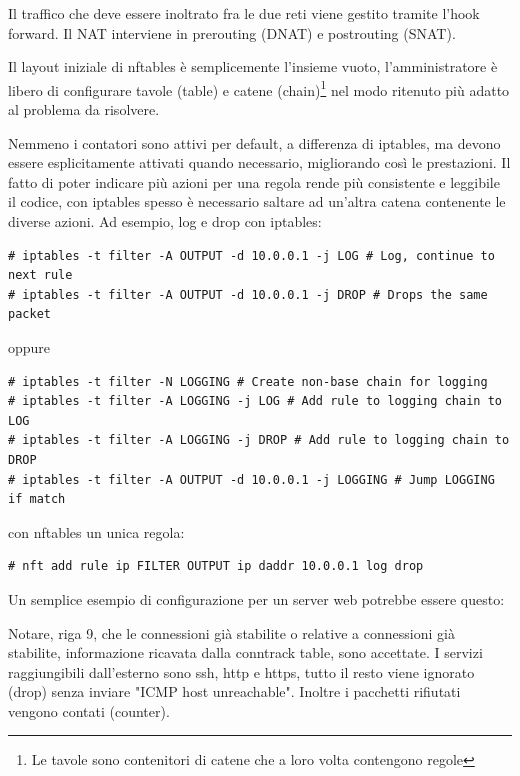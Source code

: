 Il traffico che deve essere inoltrato fra le due reti viene gestito tramite
l'hook forward. Il NAT interviene in prerouting (DNAT) e postrouting (SNAT).

Il layout iniziale di nftables \`e semplicemente l'insieme vuoto,
l'amministratore \`e libero di configurare tavole (table) e catene
(chain)\footnote{Le tavole sono contenitori di catene che a loro volta
contengono regole} nel modo ritenuto pi\`u adatto al problema da risolvere.

Nemmeno i contatori sono attivi per default, a differenza di iptables, ma
devono essere esplicitamente attivati quando necessario, migliorando
cos\`i le prestazioni. Il fatto di poter indicare pi\`u azioni per una regola
rende pi\`u consistente e leggibile il codice, con
iptables spesso è necessario saltare ad un'altra catena contenente le diverse
azioni. Ad esempio, log e drop con iptables:

\begin{lstlisting}
# iptables -t filter -A OUTPUT -d 10.0.0.1 -j LOG # Log, continue to next rule
# iptables -t filter -A OUTPUT -d 10.0.0.1 -j DROP # Drops the same packet
\end{lstlisting}
oppure 
\begin{lstlisting}
# iptables -t filter -N LOGGING # Create non-base chain for logging
# iptables -t filter -A LOGGING -j LOG # Add rule to logging chain to LOG
# iptables -t filter -A LOGGING -j DROP # Add rule to logging chain to DROP
# iptables -t filter -A OUTPUT -d 10.0.0.1 -j LOGGING # Jump LOGGING if match
\end{lstlisting}
\noindent con nftables un unica regola:
\begin{lstlisting}
# nft add rule ip FILTER OUTPUT ip daddr 10.0.0.1 log drop
\end{lstlisting}

\noindent Un semplice esempio di configurazione per un server web potrebbe essere
questo:



\noindent Notare, riga 9, che le connessioni già stabilite o relative a
connessioni già stabilite, informazione ricavata dalla conntrack table,
sono accettate.
I servizi raggiungibili dall'esterno sono ssh, http e https, tutto il resto
viene ignorato (drop) senza inviare "ICMP host unreachable". Inoltre i
pacchetti rifiutati vengono contati (counter).

\begin{minipage}{\linewidth}

\end{minipage}

